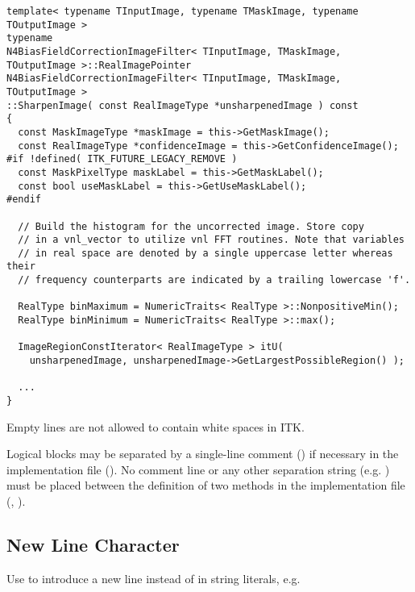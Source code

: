 \small
\begin{verbatim}
template< typename TInputImage, typename TMaskImage, typename TOutputImage >
typename
N4BiasFieldCorrectionImageFilter< TInputImage, TMaskImage, TOutputImage >::RealImagePointer
N4BiasFieldCorrectionImageFilter< TInputImage, TMaskImage, TOutputImage >
::SharpenImage( const RealImageType *unsharpenedImage ) const
{
  const MaskImageType *maskImage = this->GetMaskImage();
  const RealImageType *confidenceImage = this->GetConfidenceImage();
#if !defined( ITK_FUTURE_LEGACY_REMOVE )
  const MaskPixelType maskLabel = this->GetMaskLabel();
  const bool useMaskLabel = this->GetUseMaskLabel();
#endif

  // Build the histogram for the uncorrected image. Store copy
  // in a vnl_vector to utilize vnl FFT routines. Note that variables
  // in real space are denoted by a single uppercase letter whereas their
  // frequency counterparts are indicated by a trailing lowercase 'f'.

  RealType binMaximum = NumericTraits< RealType >::NonpositiveMin();
  RealType binMinimum = NumericTraits< RealType >::max();

  ImageRegionConstIterator< RealImageType > itU(
    unsharpenedImage, unsharpenedImage->GetLargestPossibleRegion() );

  ...
}
\end{verbatim}
\normalsize

Empty lines are not allowed to contain white spaces in ITK.

Logical blocks may be separated by a single-line comment () if
necessary in the implementation file (). No comment line or any other
separation string (e.g. \code{/***********************/}) must be placed between
the definition of two methods in the implementation file (,
).


\subsection{New Line Character}
\label{subsec:NewLineCharacter}

Use  to introduce a new line instead of  in string
literals, e.g.

